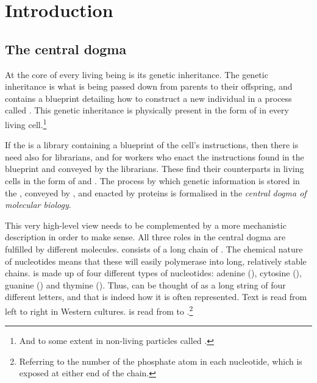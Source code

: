 \chapter{Introduction}


\section{The central dogma}

At the core of every living being is its genetic inheritance. The genetic
inheritance is what is being passed down from parents to their offspring, and
contains a blueprint detailing how to construct a new individual in a process
called . This genetic inheritance is physically present in
the form of \dna in every living cell.\footnote{And to some extent in non-living
particles called .}

If the \dna is a library containing a blueprint of the cell’s instructions, then
there is need also for librarians, and for workers who enact the instructions
found in the blueprint and conveyed by the librarians. These find their
counterparts in living cells in the form of \mrna and . The
process by which genetic information is stored in the \dna, conveyed by
\mrna[s], and enacted by proteins is formalised in the \emph{central dogma of
molecular biology}.

\begin{figure}[h!]
    \centering
\end{figure}

This very high-level view needs to be complemented by a more mechanistic
description in order to make sense. All three roles in the central dogma are
fulfilled by different molecules. \dna consists of a long chain of
. The chemical nature of nucleotides means that these will
easily polymerase into long, relatively stable chains. \dna is made up of four
different types of nucleotides: adenine (\nA), cytosine (\nC), guanine (\nG) and
thymine (\nT). Thus, \dna can be thought of as a long string of four different
letters, and that is indeed how it is often represented. Text is read from left
to right in Western cultures. \dna is read from \fivep to
\threep.\footnote{Referring to the number of the phosphate atom in each
nucleotide, which is exposed at either end of the chain.}

